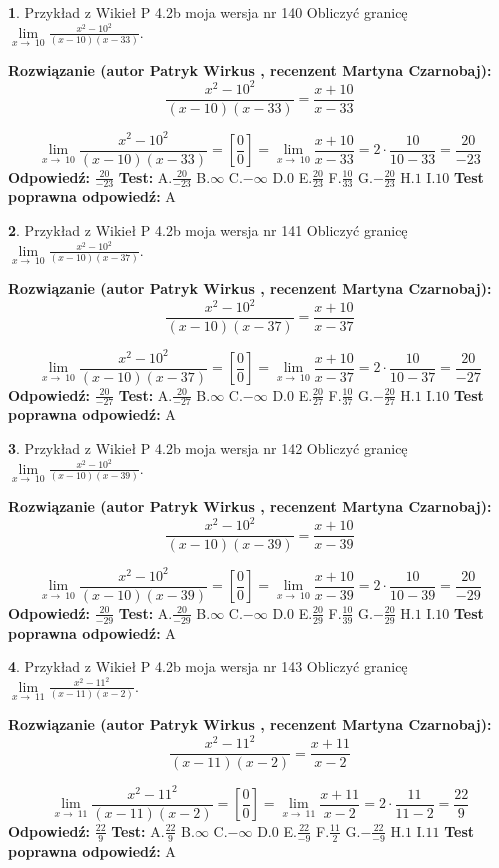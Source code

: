 \documentclass[12pt, a4paper]{article}
\theoremstyle{definition} %
\newtheorem{zad}{}
\newcommand{\zadStart}[1]{\begin{zad}#1\newline}
\newcommand{\zadStop}{\end{zad}}
\newcommand{\rozwStart}[2]{\noindent \textbf{Rozwiązanie (autor #1 , recenzent #2): }\newline}
\newcommand{\rozwStop}{\newline}
\newcommand{\odpStart}{\noindent \textbf{Odpowiedź:}\newline}
\newcommand{\odpStop}{\newline}
\newcommand{\testStart}{\noindent \textbf{Test:}\newline}
\newcommand{\testStop}{\newline}
\newcommand{\kluczStart}{\noindent \textbf{Test poprawna odpowiedź:}\newline}
\newcommand{\kluczStop}{\newline}
\begin{document}
\zadStart{Przykład z Wikieł P 4.2b moja wersja nr 140}
Obliczyć granicę $\lim\limits_{x\to\ 10}\frac{x^{2}-10^{2}}{(x-10)(x-33)}$.
\zadStop
\rozwStart{Patryk Wirkus}{Martyna Czarnobaj}
$$\frac{x^{2}-10^{2}}{(x-10)(x-33)}=\frac{x+10}{x-33}$$

$$\lim\limits_{x\to\ 10}\frac{x^{2}-10^{2}}{(x-10)(x-33)}=[\frac{0}{0}]=\lim\limits_{x\to\ 10}\frac{x+10}{x-33}=2 \cdot \frac{10}{10-33} = \frac{20}{-23}$$
\rozwStop
\odpStart
$\frac{20}{-23}$
\odpStop
\testStart
A.$\frac{20}{-23}$
B.$\infty$
C.$-\infty$
D.$0$
E.$\frac{20}{23}$
F.$\frac{10}{33}$
G.$-\frac{20}{23}$
H.$1$
I.$10$
\testStop
\kluczStart
A
\kluczStop



\zadStart{Przykład z Wikieł P 4.2b moja wersja nr 141}
Obliczyć granicę $\lim\limits_{x\to\ 10}\frac{x^{2}-10^{2}}{(x-10)(x-37)}$.
\zadStop
\rozwStart{Patryk Wirkus}{Martyna Czarnobaj}
$$\frac{x^{2}-10^{2}}{(x-10)(x-37)}=\frac{x+10}{x-37}$$

$$\lim\limits_{x\to\ 10}\frac{x^{2}-10^{2}}{(x-10)(x-37)}=[\frac{0}{0}]=\lim\limits_{x\to\ 10}\frac{x+10}{x-37}=2 \cdot \frac{10}{10-37} = \frac{20}{-27}$$
\rozwStop
\odpStart
$\frac{20}{-27}$
\odpStop
\testStart
A.$\frac{20}{-27}$
B.$\infty$
C.$-\infty$
D.$0$
E.$\frac{20}{27}$
F.$\frac{10}{37}$
G.$-\frac{20}{27}$
H.$1$
I.$10$
\testStop
\kluczStart
A
\kluczStop



\zadStart{Przykład z Wikieł P 4.2b moja wersja nr 142}
Obliczyć granicę $\lim\limits_{x\to\ 10}\frac{x^{2}-10^{2}}{(x-10)(x-39)}$.
\zadStop
\rozwStart{Patryk Wirkus}{Martyna Czarnobaj}
$$\frac{x^{2}-10^{2}}{(x-10)(x-39)}=\frac{x+10}{x-39}$$

$$\lim\limits_{x\to\ 10}\frac{x^{2}-10^{2}}{(x-10)(x-39)}=[\frac{0}{0}]=\lim\limits_{x\to\ 10}\frac{x+10}{x-39}=2 \cdot \frac{10}{10-39} = \frac{20}{-29}$$
\rozwStop
\odpStart
$\frac{20}{-29}$
\odpStop
\testStart
A.$\frac{20}{-29}$
B.$\infty$
C.$-\infty$
D.$0$
E.$\frac{20}{29}$
F.$\frac{10}{39}$
G.$-\frac{20}{29}$
H.$1$
I.$10$
\testStop
\kluczStart
A
\kluczStop



\zadStart{Przykład z Wikieł P 4.2b moja wersja nr 143}
Obliczyć granicę $\lim\limits_{x\to\ 11}\frac{x^{2}-11^{2}}{(x-11)(x-2)}$.
\zadStop
\rozwStart{Patryk Wirkus}{Martyna Czarnobaj}
$$\frac{x^{2}-11^{2}}{(x-11)(x-2)}=\frac{x+11}{x-2}$$

$$\lim\limits_{x\to\ 11}\frac{x^{2}-11^{2}}{(x-11)(x-2)}=[\frac{0}{0}]=\lim\limits_{x\to\ 11}\frac{x+11}{x-2}=2 \cdot \frac{11}{11-2} = \frac{22}{9}$$
\rozwStop
\odpStart
$\frac{22}{9}$
\odpStop
\testStart
A.$\frac{22}{9}$
B.$\infty$
C.$-\infty$
D.$0$
E.$\frac{22}{-9}$
F.$\frac{11}{2}$
G.$-\frac{22}{-9}$
H.$1$
I.$11$
\testStop
\kluczStart
A
\kluczStop
\end{document}
